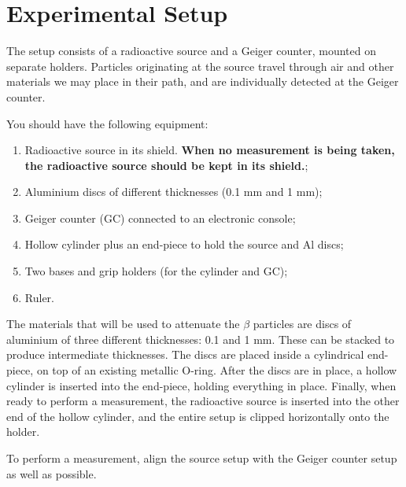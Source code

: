\section{Experimental Setup}

The setup consists of a radioactive source and a Geiger counter, mounted on separate holders. Particles originating at the source travel through air and other materials we may place in their path, and are individually detected at the Geiger counter.

You should have the following equipment:
\begin{enumerate}
\item{Radioactive source in its shield. \textbf{When no measurement is being taken, the radioactive source should be kept in its shield.};}
\item{Aluminium discs of different thicknesses (0.1 mm and 1 mm);}
\item{Geiger counter (GC) connected to an electronic console;}
\item{Hollow cylinder plus an end-piece to hold the source and Al discs;}
\item{Two bases and grip holders (for the cylinder and GC);}
\item{Ruler.}
\end{enumerate}

The materials that will be used to attenuate the $\beta$ particles are discs of aluminium of three different thicknesses: 0.1 and 1 mm. These can be stacked to produce intermediate thicknesses. The discs are placed inside a cylindrical end-piece, on top of an existing metallic O-ring. After the discs are in place, a hollow cylinder is inserted into the end-piece, holding everything in place. Finally, when ready to perform a measurement, the radioactive source is inserted into the other end of the hollow cylinder, and the entire setup is clipped horizontally onto the holder.

To perform a measurement, align the source setup with the Geiger counter setup as well as possible.